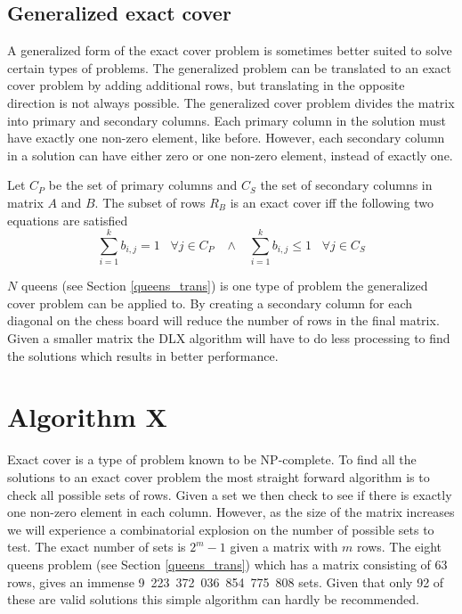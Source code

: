 \subsection{Generalized exact cover}

A generalized form of the exact cover problem is sometimes better suited to solve certain types of problems.
The generalized problem can be translated to an exact cover problem by adding additional rows, but translating in the opposite direction is not always possible.
The generalized cover problem divides the matrix into primary and secondary columns.
Each primary column in the solution must have exactly one non-zero element, like before.
However, each secondary column in a solution can have either zero or one non-zero element, instead of exactly one.

Let $C_P$ be the set of primary columns and $C_S$ the set of secondary columns in matrix $A$ and $B$.
The subset of rows $R_B$ is an exact cover iff the following two equations are satisfied
\[
	\sum_{i = 1}^{k} b_{i,j} = 1 \;\;\; \forall j \in C_P  \;\;\; \wedge \;\;\;  \sum_{i = 1}^{k} b_{i,j} \leq 1 \;\;\; \forall j \in C_S
\]


$N$ queens (see Section \ref{queens_trans}) is one type of problem the generalized cover problem can be applied to.
By creating a secondary column for each diagonal on the chess board will reduce the number of rows in the final matrix.
Given a smaller matrix the DLX algorithm will have to do less processing to find the solutions which results in better performance.



\section{Algorithm X}
\label{algox}

Exact cover is a type of problem known to be NP-complete.
To find all the solutions to an exact cover problem the most straight forward algorithm is to check all possible sets of rows.
Given a set we then check to see if there is exactly one non-zero element in each column.
However, as the size of the matrix increases we will experience a combinatorial explosion on the number of possible sets to test.
The exact number of sets is $2^{m}-1$ given a matrix with $m$ rows.
The eight queens problem (see Section \ref{queens_trans}) which has a matrix consisting of 63 rows, gives an immense 9~223~372~036~854~775~808 sets.
Given that only 92 of these are valid solutions this simple algorithm can hardly be recommended.

